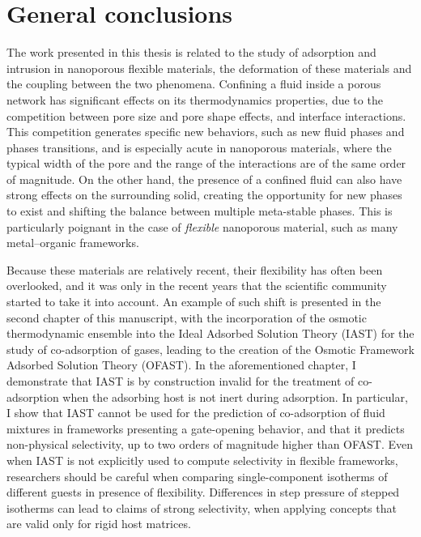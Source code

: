 
\chapter*{General conclusions}

The work presented in this thesis is related to the study of adsorption and
intrusion in nanoporous flexible materials, the deformation of these materials
and the coupling between the two phenomena. Confining a fluid inside a porous
network has significant effects on its thermodynamics properties, due to the
competition between pore size and pore shape effects, and interface
interactions. This competition generates specific new behaviors, such as new
fluid phases and phases transitions, and is especially acute in nanoporous
materials, where the typical width of the pore and the range of the interactions
are of the same order of magnitude. On the other hand, the presence of a
confined fluid can also have strong effects on the surrounding solid, creating the
opportunity for new phases to exist and shifting the balance between multiple
meta-stable phases. This is particularly poignant in the case of \emph{flexible}
nanoporous material, such as many metal--organic frameworks.

Because these materials are relatively recent, their flexibility has often been
overlooked, and it was only in the recent years that the scientific community
started to take it into account. An example of such shift is presented in the
second chapter of this manuscript, with the incorporation of the osmotic
thermodynamic ensemble into the Ideal Adsorbed Solution Theory (IAST) for the
study of co-adsorption of gases, leading to the creation of the Osmotic
Framework Adsorbed Solution Theory (OFAST). In the aforementioned chapter, I
demonstrate that IAST is by construction invalid for the treatment of
co-adsorption when the adsorbing host is not inert during adsorption. In
particular, I show that IAST cannot be used for the prediction of co-adsorption
of fluid mixtures in frameworks presenting a gate-opening behavior, and that it
predicts non-physical selectivity, up to two orders of magnitude higher than
OFAST. Even when IAST is not explicitly used to compute selectivity in flexible
frameworks, researchers should be careful when comparing single-component
isotherms of different guests in presence of flexibility. Differences in step
pressure of stepped isotherms can lead to claims of strong selectivity, when
applying concepts that are valid only for rigid host matrices.

